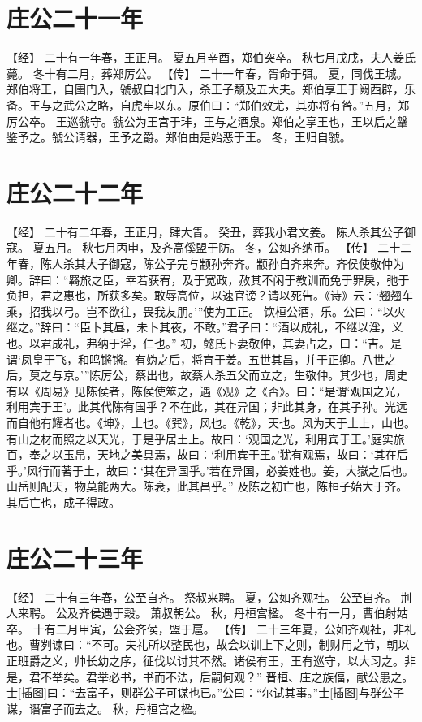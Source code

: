 \documentclass[a4paper,12pt,UTF8,twoside]{ctexbook}
\begin{document}
\section{庄公二十一年}

【经】
二十有一年春，王正月。
夏五月辛酉，郑伯突卒。
秋七月戊戌，夫人姜氏薨。
冬十有二月，葬郑厉公。
【传】
二十一年春，胥命于弭。
夏，同伐王城。郑伯将王，自圉门入，虢叔自北门入，杀王子颓及五大夫。郑伯享王于阙西辟，乐备。王与之武公之略，自虎牢以东。原伯曰：“郑伯效尤，其亦将有咎。”五月，郑厉公卒。
王巡虢守。虢公为王宫于玤，王与之酒泉。郑伯之享王也，王以后之鞶鉴予之。虢公请器，王予之爵。郑伯由是始恶于王。
冬，王归自虢。

\section{庄公二十二年}

【经】
二十有二年春，王正月，肆大眚。
癸丑，葬我小君文姜。
陈人杀其公子御寇。
夏五月。
秋七月丙申，及齐高傒盟于防。
冬，公如齐纳币。
【传】
二十二年春，陈人杀其大子御寇，陈公子完与颛孙奔齐。颛孙自齐来奔。齐侯使敬仲为卿。辞曰：“羇旅之臣，幸若获宥，及于宽政，赦其不闲于教训而免于罪戾，弛于负担，君之惠也，所获多矣。敢辱高位，以速官谤？请以死告。《诗》云：‘翘翘车乘，招我以弓。岂不欲往，畏我友朋。’”使为工正。
饮桓公酒，乐。公曰：“以火继之。”辞曰：“臣卜其昼，未卜其夜，不敢。”君子曰：“酒以成礼，不继以淫，义也。以君成礼，弗纳于淫，仁也。”
初，懿氏卜妻敬仲，其妻占之，曰：“吉。是谓‘凤皇于飞，和鸣锵锵。有妫之后，将育于姜。五世其昌，并于正卿。八世之后，莫之与京。’”陈厉公，蔡出也，故蔡人杀五父而立之，生敬仲。其少也，周史有以《周易》见陈侯者，陈侯使筮之，遇《观》之《否》。曰：“是谓‘观国之光，利用宾于王’。此其代陈有国乎？不在此，其在异国；非此其身，在其子孙。光远而自他有耀者也。《坤》，土也。《巽》，风也。《乾》，天也。风为天于土上，山也。有山之材而照之以天光，于是乎居土上。故曰：‘观国之光，利用宾于王。’庭实旅百，奉之以玉帛，天地之美具焉，故曰：‘利用宾于王。’犹有观焉，故曰：‘其在后乎。’风行而著于土，故曰：‘其在异国乎。’若在异国，必姜姓也。姜，大嶽之后也。山岳则配天，物莫能两大。陈衰，此其昌乎。”
及陈之初亡也，陈桓子始大于齐。其后亡也，成子得政。

\section{庄公二十三年}

【经】
二十有三年春，公至自齐。
祭叔来聘。
夏，公如齐观社。
公至自齐。
荆人来聘。
公及齐侯遇于穀。
萧叔朝公。
秋，丹桓宫楹。
冬十有一月，曹伯射姑卒。
十有二月甲寅，公会齐侯，盟于扈。
【传】
二十三年夏，公如齐观社，非礼也。曹刿谏曰：“不可。夫礼所以整民也，故会以训上下之则，制财用之节，朝以正班爵之义，帅长幼之序，征伐以讨其不然。诸侯有王，王有巡守，以大习之。非是，君不举矣。君举必书，书而不法，后嗣何观？”
晋桓、庄之族偪，献公患之。士[插图]曰：“去富子，则群公子可谋也已。”公曰：“尔试其事。”士[插图]与群公子谋，谮富子而去之。
秋，丹桓宫之楹。
\end{document}
